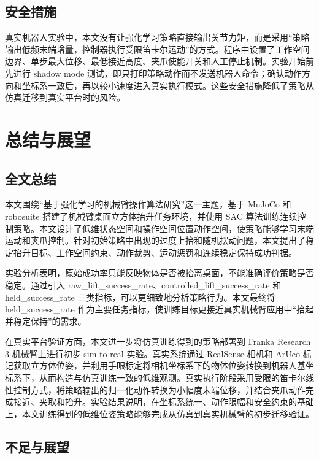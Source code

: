 \documentclass[
    type = bachelor,
    oneside,
    fontset = fandol
]{njuthesis}
\begin{document}
\section{安全措施}

真实机器人实验中，本文没有让强化学习策略直接输出关节力矩，而是采用“策略输出低频末端增量，控制器执行受限笛卡尔运动”的方式。程序中设置了工作空间边界、单步最大位移、最低接近高度、夹爪使能开关和人工停止机制。实验开始前先进行 shadow mode 测试，即只打印策略动作而不发送机器人命令；确认动作方向和坐标系一致后，再以较小速度进入真实执行模式。这些安全措施降低了策略从仿真迁移到真实平台时的风险。

\chapter{总结与展望}

\section{全文总结}

本文围绕“基于强化学习的机械臂操作算法研究”这一主题，基于 MuJoCo 和 robosuite 搭建了机械臂桌面立方体抬升任务环境，并使用 SAC 算法训练连续控制策略。本文设计了低维状态空间和操作空间位置动作空间，使策略能够学习末端运动和夹爪控制。针对初始策略中出现的过度上抬和随机摆动问题，本文提出了稳定抬升目标、工作空间约束、动作裁剪、运动惩罚和连续稳定保持成功判据。

实验分析表明，原始成功率只能反映物体是否被抬离桌面，不能准确评价策略是否稳定。通过引入 raw\_lift\_success\_rate、controlled\_lift\_success\_rate 和 held\_success\_rate 三类指标，可以更细致地分析策略行为。本文最终将 held\_success\_rate 作为主要任务指标，使训练目标更接近真实机械臂应用中“抬起并稳定保持”的需求。

在真实平台验证方面，本文进一步将仿真训练得到的策略部署到 Franka Research 3 机械臂上进行初步 sim-to-real 实验。真实系统通过 RealSense 相机和 ArUco 标记获取立方体位姿，并利用手眼标定将相机坐标系下的物体位姿转换到机器人基坐标系下，从而构造与仿真训练一致的低维观测。真实执行阶段采用受限的笛卡尔线性控制方式，将策略输出的归一化动作转换为小幅度末端位移，并结合夹爪动作完成接近、夹取和抬升。实验结果说明，在坐标系统一、动作限幅和安全约束的基础上，本文训练得到的低维位姿策略能够完成从仿真到真实机械臂的初步迁移验证。

\section{不足与展望}
\end{document}
